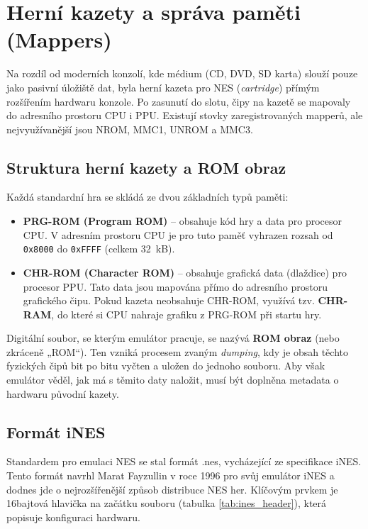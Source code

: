 \section{Herní kazety a správa paměti (Mappers)}
\label{sec:mappers}

Na rozdíl od moderních konzolí, kde médium (CD, DVD, SD karta) slouží pouze jako pasivní úložiště
dat, byla herní kazeta pro NES (\textit{cartridge}) přímým rozšířením hardwaru konzole. Po zasunutí
do slotu, čipy na kazetě se mapovaly do adresního prostoru CPU i PPU. Existují stovky
zaregistrovaných mapperů, ale nejvyužívanější jsou NROM, MMC1, UNROM a MMC3.

\subsection{Struktura herní kazety a ROM obraz}

Každá standardní hra se skládá ze dvou základních typů paměti:

\begin{itemize}
    \item \textbf{PRG-ROM (Program ROM)} -- obsahuje kód hry a data pro procesor CPU. V adresním
        prostoru CPU je pro tuto paměť vyhrazen rozsah od \texttt{0x8000} do \texttt{0xFFFF} (celkem
        32~kB).
    \item \textbf{CHR-ROM (Character ROM)} -- obsahuje grafická data (dlaždice) pro procesor PPU. Tato
        data jsou mapována přímo do adresního prostoru grafického čipu. Pokud kazeta neobsahuje
        CHR-ROM, využívá tzv. \textbf{CHR-RAM}, do které si CPU nahraje grafiku z PRG-ROM při startu
        hry.
\end{itemize}

Digitální soubor, se kterým emulátor pracuje, se nazývá \textbf{ROM obraz} (nebo zkráceně „ROM“).
Ten vzniká procesem zvaným \textit{dumping}, kdy je obsah těchto fyzických čipů bit po bitu vyčten a
uložen do jednoho souboru. Aby však emulátor věděl, jak má s těmito daty naložit, musí být doplněna
metadata o hardwaru původní kazety.

\subsection{Formát iNES}

Standardem pro emulaci NES se stal formát .nes, vycházející ze specifikace iNES. Tento formát navrhl
Marat Fayzullin v roce 1996 pro svůj emulátor iNES a dodnes jde o nejrozšířenější způsob distribuce
NES her. Klíčovým prvkem je 16bajtová hlavička na začátku souboru (tabulka \ref{tab:ines_header}),
která popisuje konfiguraci hardwaru.

